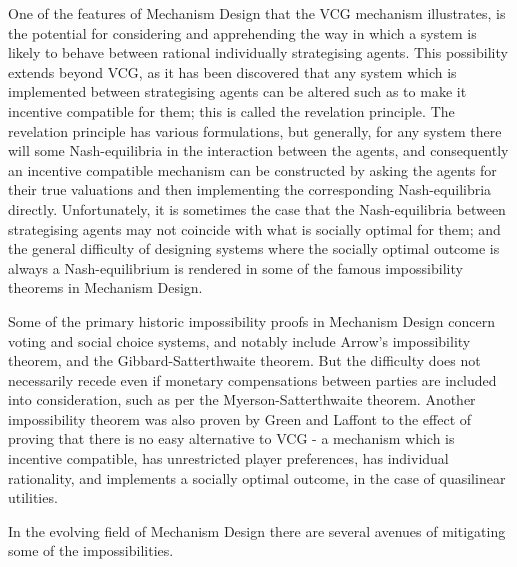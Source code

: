 One of the features of Mechanism Design that the VCG mechanism illustrates, is the potential for considering and apprehending the way in which a system is likely to behave between rational individually strategising agents.
This possibility extends beyond VCG, as it has been discovered that any system which is implemented between strategising agents can be altered such as to make it incentive compatible for them; this is called the revelation principle.\cite{RePEc:ecm:emetrp:v:41:y:1973:i:4:p:587-601} \cite[Chapter~2.3]{37377}
The revelation principle has various formulations, but generally, for any system there will some Nash-equilibria in the interaction between the agents, and consequently an incentive compatible mechanism can be constructed by asking the agents for their true valuations and then implementing the corresponding Nash-equilibria directly.
Unfortunately, it is sometimes the case that the Nash-equilibria between strategising agents may not coincide with what is socially optimal for them; and the general difficulty of designing systems where the socially optimal outcome is always a Nash-equilibrium is rendered in some of the famous impossibility theorems in Mechanism Design. %

Some of the primary historic impossibility proofs in Mechanism Design concern voting and social choice systems, and notably include Arrow's impossibility theorem, and the Gibbard-Satterthwaite theorem.
But the difficulty does not necessarily recede even if monetary compensations between parties are included into consideration, such as per the Myerson-Satterthwaite theorem.
Another impossibility theorem was also proven by Green and Laffont \cite{29088} to the effect of proving that there is no easy alternative to VCG - a mechanism which is incentive compatible, has unrestricted player preferences, has individual rationality, and implements a socially optimal outcome, in the case of quasilinear utilities.

In the evolving field of Mechanism Design there are several avenues of mitigating some of the impossibilities.


